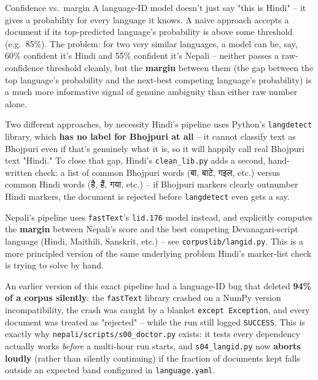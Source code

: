 \documentclass[11pt]{report}
\newcommand{\dn}[1]{{\devanagarifont #1}}
\begin{document}
\begin{concept}{Confidence vs.\ margin}
A language-ID model doesn't just say "this is Hindi" -- it gives a
probability for every language it knows. A naive approach accepts a
document if its top-predicted language's probability is above some
threshold (e.g.\ 85\%). The problem: for two very similar languages, a
model can be, say, 60\% confident it's Hindi and 55\% confident it's
Nepali -- neither passes a raw-confidence threshold cleanly, but the
\textbf{margin} between them (the gap between the top language's
probability and the next-best competing language's probability) is a
much more informative signal of genuine ambiguity than either raw number
alone.
\end{concept}

\begin{implementation}{Two different approaches, by necessity}
Hindi's pipeline uses Python's \texttt{langdetect} library, which
\textbf{has no label for Bhojpuri at all} -- it cannot classify text as
Bhojpuri even if that's genuinely what it is, so it will happily call
real Bhojpuri text "Hindi." To close that gap, Hindi's
\texttt{clean\_lib.py} adds a second, hand-written check: a list of
common Bhojpuri words (\dn{बा}, \dn{बाटे}, \dn{गइल}, etc.) versus common
Hindi words (\dn{है}, \dn{हैं}, \dn{गया}, etc.) -- if Bhojpuri markers
clearly outnumber Hindi markers, the document is rejected before
\texttt{langdetect} even gets a say.

Nepali's pipeline uses \texttt{fastText}'s \texttt{lid.176} model
instead, and explicitly computes the \textbf{margin} between Nepali's
score and the best competing Devanagari-script language (Hindi, Maithili,
Sanskrit, etc.) -- see \texttt{corpuslib/langid.py}. This is a more
principled version of the same underlying problem Hindi's marker-list
check is trying to solve by hand.

\begin{warnbox}
An earlier version of this exact pipeline had a language-ID bug that
deleted \textbf{94\% of a corpus silently}: the \texttt{fastText} library
crashed on a NumPy version incompatibility, the crash was caught by a
blanket \texttt{except Exception}, and every document was treated as
"rejected" -- while the run still logged \texttt{SUCCESS}. This is
exactly why \texttt{nepali/scripts/s00\_doctor.py} exists: it tests every
dependency actually works \textit{before} a multi-hour run starts, and
\texttt{s04\_langid.py} now \textbf{aborts loudly} (rather than silently
continuing) if the fraction of documents kept falls outside an expected
band configured in \texttt{language.yaml}.
\end{warnbox}
\end{implementation}
\end{document}
